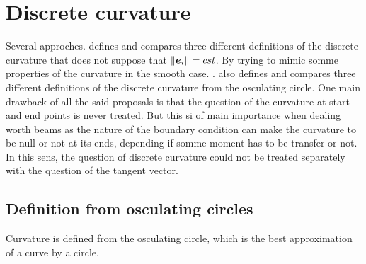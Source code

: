 \section{Discrete curvature}
Several approches. \cite{Vouga2014} defines and compares three different definitions of the discrete curvature that does not suppose that $\lVert\boldsymbol{e}_i\rVert = cst$. By trying to mimic somme properties of the curvature in the smooth case. \cite{Bobenko2015}. \cite{Carroll2014} also defines and compares three different definitions of the discrete curvature from the osculating circle. One main drawback of all the said proposals is that the question of the curvature at  start and end points is never treated. But this si of main importance when dealing worth beams as the nature of the boundary condition can make the curvature to be null or not at its ends, depending if somme moment has to be transfer or not. In this sens, the question of discrete curvature could not be treated separately with the question of the tangent vector.
%
%


\cite{Romon2013}

\subsection{Definition from osculating circles}
Curvature is defined from the osculating circle, which is the best approximation of a curve by a circle.

